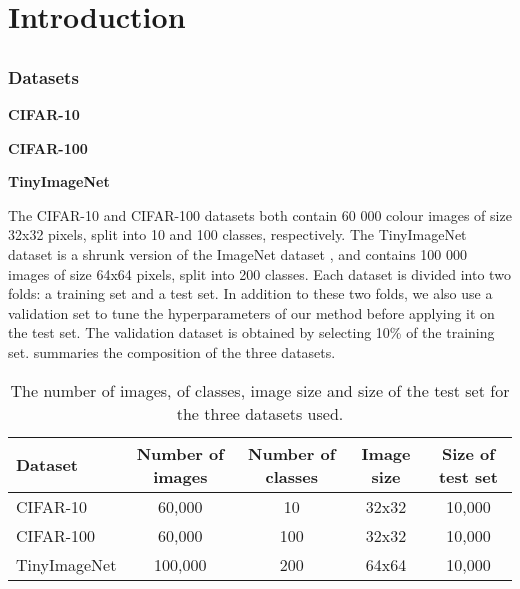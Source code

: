 \chapter{Introduction}
\section{}
\subsection{Datasets}

\textbf{CIFAR-10} 


\textbf{CIFAR-100}

\textbf{TinyImageNet}


The CIFAR-10 and CIFAR-100 datasets both contain 60 000 colour images of size
32x32 pixels, split into 10 and 100 classes, respectively. The TinyImageNet
dataset is a shrunk version of the ImageNet dataset
\cite{DBLP:journals/ijcv/RussakovskyDSKS15}, and contains 100 000 images of size
64x64 pixels, split into 200 classes. Each dataset is divided into two folds: a
training set and a test set. In addition to these two folds, we also use a
validation set to tune the hyperparameters of our method before applying it on
the test set. The validation dataset is obtained by selecting 10\% of the
training set.  summaries the composition of the three
datasets.\\


\begin{table}[ht]
  \centering
  \begin{tabular}{lcccc}
    \toprule
    \textbf{Dataset}    & \textbf{Number of images} & \textbf{Number of classes} &
    \textbf{Image size} & \textbf{Size of test set}                                               \\
    \hline
    CIFAR-10             & 60,000                    & 10                         & 32x32 & 10,000 \\
    CIFAR-100            & 60,000                    & 100                        & 32x32 & 10,000 \\
    TinyImageNet        & 100,000                   & 200                        & 64x64 & 10,000 \\
    \bottomrule
  \end{tabular}
  \caption{The number of images, of classes, image size and size of the test set for the three datasets used.}
  \label{tab:chap1:datasets}
\end{table}

